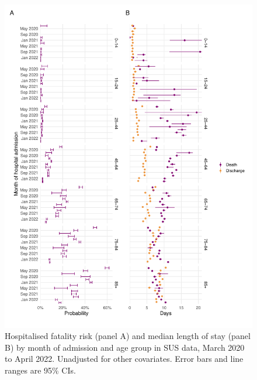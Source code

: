 \begin{figure}[htbp!]
    \centering
    \includegraphics[width=\textwidth]{hfr_month_age.pdf}
    \caption[Hospitalised fatality risk and median length of stay by month of admission and age group in SUS data, March 2020 to April 2022]{Hospitalised fatality risk (panel A) and median length of stay (panel B) by month of admission and age group in SUS data, March 2020 to April 2022. Unadjusted for other covariates. Error bars and line ranges are 95\% CIs.}\label{fig:hfr-month-age}
\end{figure}

